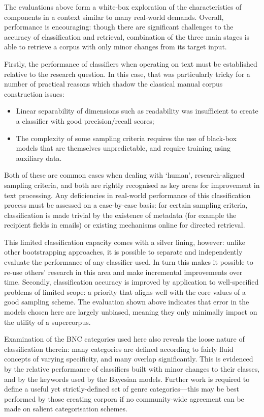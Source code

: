 



The evaluations above form a white-box exploration of the characteristics of components in a context similar to many real-world demands.  Overall, performance is encouraging: though there are significant challenges to the accuracy of classification and retrieval, combination of the three main stages is able to retrieve a corpus with only minor changes from its target input.

Firstly, the performance of classifiers when operating on text must be established relative to the research question.  In this case, that was particularly tricky for a number of practical reasons which shadow the classical manual corpus construction issues:

\begin{itemize}
    \item Linear separability of dimensions such as readability was insufficient to create a classifier with good precision/recall scores;
    \item The complexity of some sampling criteria requires the use of black-box models that are themselves unpredictable, and require training using auxiliary data.
\end{itemize}

Both of these are common cases when dealing with `human', research-aligned sampling criteria, and both are rightly recognised as key areas for improvement in text processing.  Any deficiencies in real-world performance of this classification process must be assessed on a case-by-case basis: for certain sampling criteria, classification is made trivial by the existence of metadata (for example the recipient fields in emails) or existing mechanisms online for directed retrieval.  

This limited classification capacity comes with a silver lining, however: unlike other bootstrapping approaches, it is possible to separate and independently evaluate the performance of any classifier used.  In turn this makes it possible to re-use others' research in this area and make incremental improvements over time.  Secondly, classification accuracy is improved by application to well-specified problems of limited scope: a priority that aligns well with the core values of a good sampling scheme.  The evaluation shown above indicates that error in the models chosen here are largely unbiased, meaning they only minimally impact on the utility of a supercorpus.


Examination of the BNC categories used here also reveals the loose nature of classification therein: many categories are defined according to fairly fluid concepts of varying specificity, and many overlap significantly.  This is evidenced by the relative performance of classifiers built with minor changes to their classes, and by the keywords used by the Bayesian models.  Further work is required to define a useful yet strictly-defined set of genre categories---this may be best performed by those creating corpora if no community-wide agreement can be made on salient categorisation schemes.


